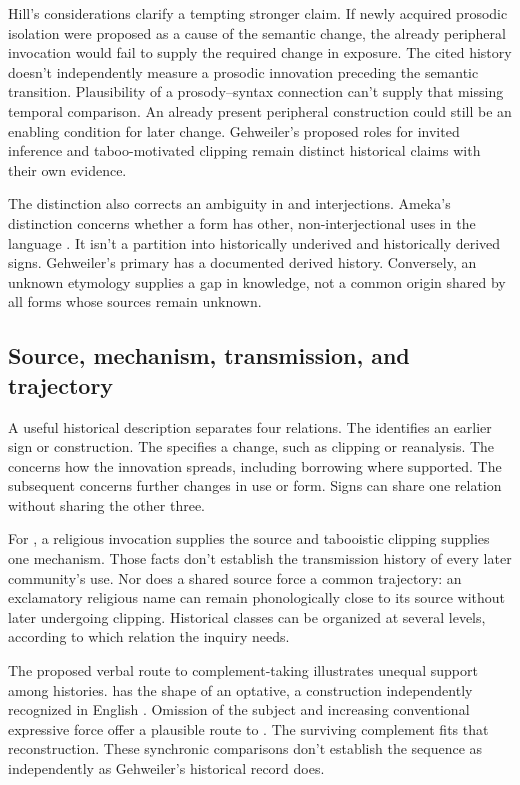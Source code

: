 \documentclass[12pt]{article}
\begin{document}
Hill's considerations clarify a tempting stronger claim. If newly acquired
prosodic isolation were proposed as a cause of the semantic change, the
already peripheral invocation would fail to supply the required change
in exposure. The cited history doesn't independently measure a prosodic
innovation preceding the semantic transition. Plausibility of a
prosody--syntax connection can't supply that missing temporal comparison.
An already present peripheral construction could still be an enabling
condition for later change.
Gehweiler's proposed roles for invited inference and taboo-motivated
clipping remain distinct historical claims with their own evidence.

The distinction also corrects an ambiguity in  and
 interjections. Ameka's distinction concerns whether
a form has other, non-interjectional uses in the language
\citep[105--106]{ameka1992}. It isn't a partition into historically
underived and historically derived signs. Gehweiler's primary
 has a documented derived history. Conversely, an unknown
etymology supplies a gap in knowledge, not a common origin shared by
all forms whose sources remain unknown.

\subsection{Source, mechanism, transmission, and trajectory}

A useful historical description separates four relations. The
 identifies an earlier sign or construction. The
 specifies a change, such as clipping or reanalysis.
The  concerns how the innovation spreads,
including borrowing where supported. The subsequent 
concerns further changes in use or form. Signs can share one relation
without sharing the other three.

For , a religious invocation supplies the source and
tabooistic clipping supplies one mechanism. Those facts don't establish
the transmission history of every later community's use. Nor does a
shared source force a common trajectory: an exclamatory religious name
can remain phonologically close to its source without later undergoing
clipping. Historical classes can be organized at several
levels, according to which relation the inquiry needs.

The proposed verbal route to complement-taking  illustrates
unequal support among histories.  has the shape
of an optative, a construction independently recognized in English
\citep[944]{HuddlestonPullum2002}. Omission of the subject and increasing
conventional expressive force offer a plausible route to . The surviving complement fits that reconstruction. These synchronic
comparisons don't establish the sequence as independently as Gehweiler's
historical record does.
\end{document}
